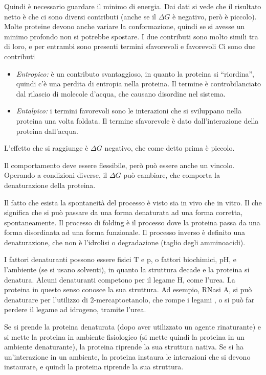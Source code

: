 Quindi è necessario guardare il minimo di energia.
Dai dati si vede che il risultato netto è che ci sono diversi
contributi (anche se il $\Delta G$ è negativo, però è piccolo).
Molte proteine devono anche variare la conformazione, quindi se si
avesse un minimo profondo non si potrebbe spostare.
I due contributi sono molto simili tra di loro, e per entrambi sono
presenti termini sfavorevoli e favorevoli Ci sono due contributi

\begin{itemize}
\item
\emph{Entropico:} è un contributo svantaggioso, in quanto la proteina si
``riordina'', quindi c'è una perdita di entropia nella proteina. Il
termine è controbilanciato dal rilascio di molecole d'acqua, che
causano disordine nel sistema.
\item
\emph{Entalpico:} i termini favorevoli sono le interazioni che si sviluppano
nella proteina una volta foldata. Il termine sfavorevole è dato
dall'interazione della proteina dall'acqua.
\end{itemize}

L'effetto che si raggiunge è $\Delta G$ negativo, che come detto prima è
piccolo.

Il comportamento deve essere flessibile, però può essere anche un
vincolo. Operando a condizioni diverse, il $\Delta G$ può cambiare, che
comporta la denaturazione della proteina.

Il fatto che esista la spontaneità del processo è visto sia in vivo che
in vitro. Il che significa che si può passare da una forma denaturata ad
una forma corretta, spontaneamente. Il processo di folding è il processo
dove la proteina passa da una forma disordinata ad una forma funzionale.
Il processo inverso è definito una denaturazione, che non è l'idrolisi o
degradazione (taglio degli amminoacidi).

I fattori denaturanti possono essere fisici T e p, o fattori biochimici,
pH, e l'ambiente (se si usano solventi), in quanto la struttura decade e
la proteina si denatura.
Alcuni denaturanti competono per il legame H, come l'urea.
La proteina in questo senso conosce la sua struttura.
Ad esempio, RNasi A, si può denaturare per l'utilizzo di
2-mercaptoetanolo, che rompe i legami , o si può far perdere il legame
ad idrogeno, tramite l'urea.

Se si prende la proteina denaturata (dopo aver utilizzato un agente
rinaturante) e si mette la proteina in ambiente fisiologico (si mette
quindi la proteina in un ambiente denaturante), la proteina riprende la
sua struttura nativa.
Se si ha un'interazione in un ambiente, la proteina instaura le
interazioni che si devono instaurare, e quindi la proteina riprende la
sua struttura.

